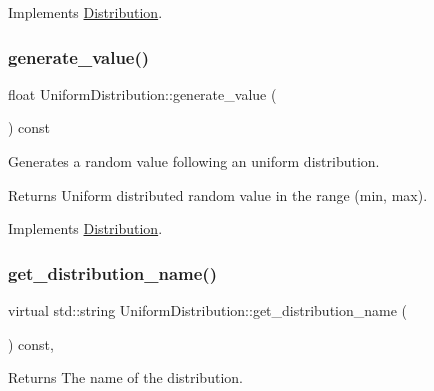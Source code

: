 Implements \hyperlink{classDistribution_a0778c93fb686dd1abe2830e1c7e564a6}{Distribution}.

\mbox{\label{classUniformDistribution_ab2bfddd4540b6f88d1d366c9d1bbb5e6}} 
\subsubsection{\texorpdfstring{generate\+\_\+value()}{generate\_value()}}
{\footnotesize\ttfamily float Uniform\+Distribution\+::generate\+\_\+value (\begin{DoxyParamCaption}{ }\end{DoxyParamCaption}) const\hspace{0.3cm}{\ttfamily [virtual]}}

Generates a random value following an uniform distribution. \begin{DoxyReturn}{Returns}
Uniform distributed random value in the range (min, max). 
\end{DoxyReturn}


Implements \hyperlink{classDistribution_aa1ea89994ac123f003b8b8f5fe6fad40}{Distribution}.

\mbox{\label{classUniformDistribution_a41a9a47839d15e67d5e2432f983ed382}} 
\subsubsection{\texorpdfstring{get\+\_\+distribution\+\_\+name()}{get\_distribution\_name()}}
{\footnotesize\ttfamily virtual std\+::string Uniform\+Distribution\+::get\+\_\+distribution\+\_\+name (\begin{DoxyParamCaption}{ }\end{DoxyParamCaption}) const\hspace{0.3cm}{\ttfamily [inline]}, {\ttfamily [virtual]}}

\begin{DoxyReturn}{Returns}
The name of the distribution. 
\end{DoxyReturn}


